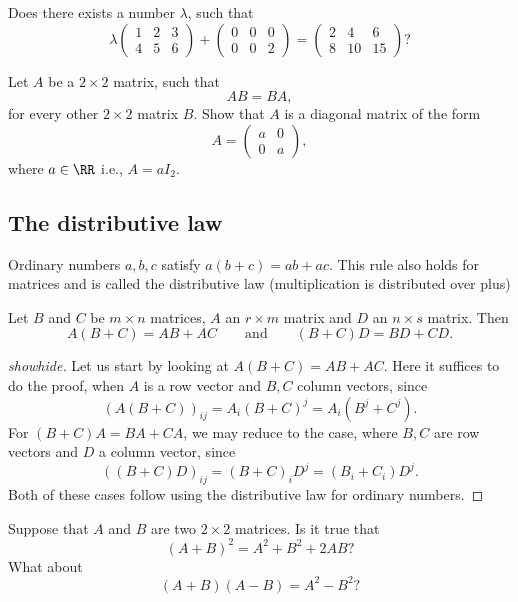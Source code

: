\documentclass{article}
\begin{document}
\beginshex
Does there exists a number  $\lambda$, such that 
$$
\lambda 
\begin{pmatrix}
1 & 2 & 3\\
4 & 5 & 6
\end{pmatrix} 
+
\begin{pmatrix}
0 & 0 & 0\\
0 & 0 & 2
\end{pmatrix} 
= 
\begin{pmatrix}
2 & 4 & 6\\
8 & 10 & 15
\end{pmatrix}?
$$
\endshex


\beginshex
Let $A$ be a $2\times 2$ matrix, such that
$$
A B = B A,
$$
for every other $2\times 2$ matrix $B$. Show that $A$ is a diagonal matrix of the form
$$
A =
\begin{pmatrix}
  a & 0\\
  0 & a
\end{pmatrix},
$$
where $a\in \RR$ i.e., $A = a I_2$.
\endshex


\subsection{The distributive law}

Ordinary numbers $a, b, c$ satisfy
$a (b + c) = a b + a c$. This rule also holds for
matrices and is called the distributive law (multiplication
is distributed over plus)

\begin{proposition}
Let $B$ and $C$ be $m\times n$ matrices, $A$ an $r\times m$ matrix and $D$ an $n\times s$ matrix. Then
$$
A ( B + C) = A B + A C\qquad\text{and}\qquad (B + C) D = B D + C D.
$$
\end{proposition}
\begin{proof}[showhide]
  Let us start by looking at $A(B+C) = A B + A C$. 
Here it suffices to do the proof, when $A$ is a row vector and
$B, C$ column vectors, since
$$
(A (B+C))_{ij} = A_i (B+C)^j = A_i (B^j + C^j).
$$
For $(B + C) A = B A + C A$, we may reduce to the case, where
$B, C$ are row vectors and  $D$ a column vector, since
$$
((B+C) D)_{ij} = (B+C)_i D^j = (B_i + C_i) D^j.
$$
Both of these cases follow using the distributive law for ordinary numbers.
\end{proof}




\beginshex
Suppose that $A$ and $B$ are two $2\times 2$ matrices. Is it true that
$$
(A + B)^2 = A^2 + B^2 + 2 A B?
$$
What about
$$
(A + B) (A - B) = A^2 - B^2?
$$
\endshex
\end{document}
